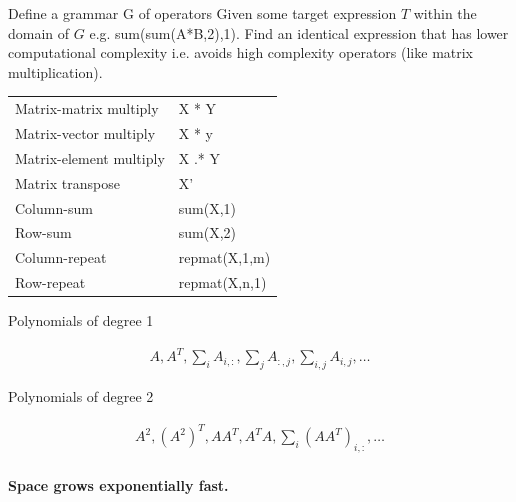 \documentclass[landscape,a0b]{a0poster_csml_v2}
\begin{document}
\begin{poster}
\begin{PosterColumn}
Define a grammar G of operators
Given some target expression $T$ within the domain of $G$
e.g. sum(sum(A*B,2),1). Find an identical expression that has lower computational 
complexity i.e. avoids high complexity operators (like matrix multiplication).
\vspace{0.2cm}

\begin{minipage}[hc]{0.47\textwidth}
  \begin{center}
    \begin{tabular}{ll}
      \hline
      Matrix-matrix multiply   \hspace{1cm}   &  X * Y \\
      Matrix-vector multiply      & X * y \\
      Matrix-element multiply     & X .* Y \\
      Matrix transpose            & X’ \\
      Column-sum                  & sum(X,1) \\
      Row-sum                     & sum(X,2) \\
      Column-repeat               & repmat(X,1,m) \\
      Row-repeat                  & repmat(X,n,1) \\
      \hline
    \end{tabular}
  \end{center}
\end{minipage}
\hfill
\begin{minipage}[hc]{0.47\textwidth}
\begin{center}
Polynomials of degree 1
\end{center}
\begin{align*}
  A, A^T, \sum_i A_{i, :}, \sum_j A_{:, j}, \sum_{i, j} A_{i, j}, \dots 
\end{align*}
\begin{center}
Polynomials of degree 2
\end{center}
\begin{align*}
  A^2, (A^2)^T, AA^T, A^TA, \sum_i (AA^T)_{i, :}, \dots \\
\end{align*}
\end{minipage}
\vspace{-0.4cm}
\begin{center}
  {\bf Space grows exponentially fast.}
\end{center}
\vspace{-0.4cm}


\end{PosterColumn}
\end{poster}
\end{document}
